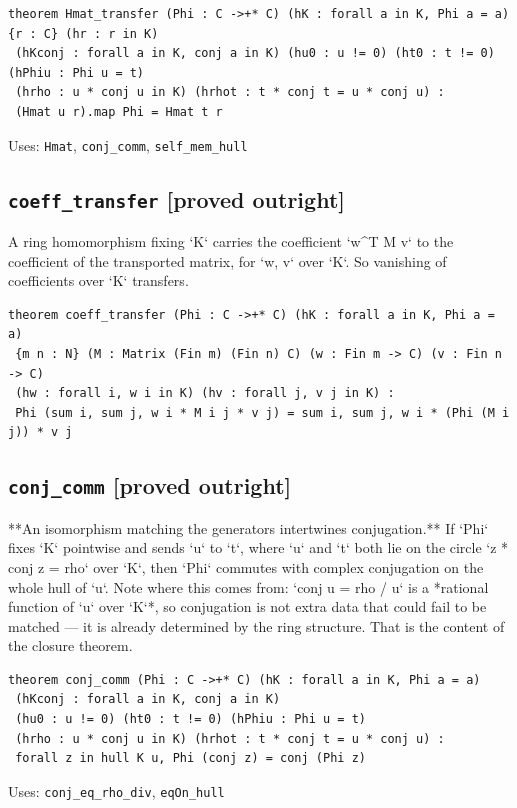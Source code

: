 \documentclass[11pt,a4paper]{article}
\newcommand{\tagpr}{\textcolor{provedc}{\textbf{[proved outright]}}}
\begin{document}
\begin{lstlisting}
theorem Hmat_transfer (Phi : C ->+* C) (hK : forall a in K, Phi a = a) {r : C} (hr : r in K)
 (hKconj : forall a in K, conj a in K) (hu0 : u != 0) (ht0 : t != 0) (hPhiu : Phi u = t)
 (hrho : u * conj u in K) (hrhot : t * conj t = u * conj u) :
 (Hmat u r).map Phi = Hmat t r
\end{lstlisting}
\noindent\footnotesize Uses: \texttt{Hmat}, \texttt{conj\_comm}, \texttt{self\_mem\_hull}\normalsize


\subsection*{\texttt{coeff\_transfer} \hfill \tagpr}

A ring homomorphism fixing `K` carries the coefficient `w\^{}T M v` to the coefficient of the transported matrix, for `w, v` over `K`. So vanishing of coefficients over `K` transfers.

\begin{lstlisting}
theorem coeff_transfer (Phi : C ->+* C) (hK : forall a in K, Phi a = a)
 {m n : N} (M : Matrix (Fin m) (Fin n) C) (w : Fin m -> C) (v : Fin n -> C)
 (hw : forall i, w i in K) (hv : forall j, v j in K) :
 Phi (sum i, sum j, w i * M i j * v j) = sum i, sum j, w i * (Phi (M i j)) * v j
\end{lstlisting}

\subsection*{\texttt{conj\_comm} \hfill \tagpr}

**An isomorphism matching the generators intertwines conjugation.** If `Phi` fixes `K` pointwise and sends `u` to `t`, where `u` and `t` both lie on the circle `z * conj z = rho` over `K`, then `Phi` commutes with complex conjugation on the whole hull of `u`. Note where this comes from: `conj u = rho / u` is a *rational function of `u` over `K`*, so conjugation is not extra data that could fail to be matched --- it is already determined by the ring structure. That is the content of the closure theorem.

\begin{lstlisting}
theorem conj_comm (Phi : C ->+* C) (hK : forall a in K, Phi a = a)
 (hKconj : forall a in K, conj a in K)
 (hu0 : u != 0) (ht0 : t != 0) (hPhiu : Phi u = t)
 (hrho : u * conj u in K) (hrhot : t * conj t = u * conj u) :
 forall z in hull K u, Phi (conj z) = conj (Phi z)
\end{lstlisting}
\noindent\footnotesize Uses: \texttt{conj\_eq\_rho\_div}, \texttt{eqOn\_hull}\normalsize
\end{document}
